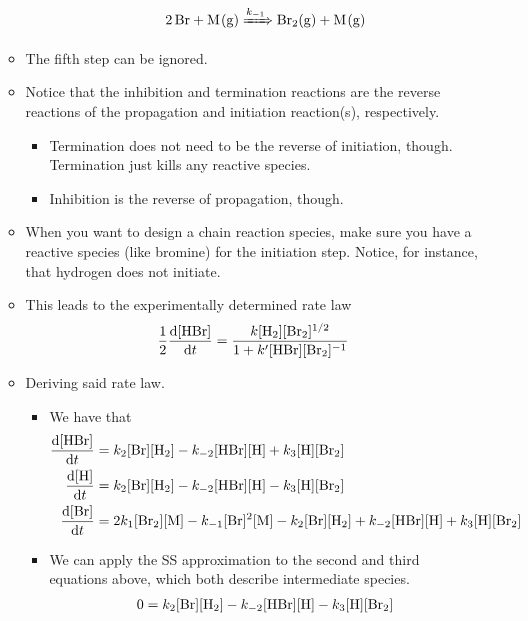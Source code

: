\documentclass[../notes.tex]{subfiles}
\begin{document}
\begin{itemize}
\begin{itemize}
\begin{itemize}
\begin{equation*}
                \ce{2Br + M(g)} \xRightarrow{k_{-1}} \ce{Br2(g) + M(g)}
            \end{equation*}
        \end{itemize}
        \item The fifth step can be ignored.
        \item Notice that the inhibition and termination reactions are the reverse reactions of the propagation and initiation reaction(s), respectively.
        \begin{itemize}
            \item Termination does not need to be the reverse of initiation, though. Termination just kills any reactive species.
            \item Inhibition is the reverse of propagation, though.
        \end{itemize}
        \item When you want to design a chain reaction species, make sure you have a reactive species (like bromine) for the initiation step. Notice, for instance, that hydrogen does not initiate.
        \item This leads to the experimentally determined rate law
        \begin{equation*}
            \frac{1}{2}\dv{[\ce{HBr}]}{t} = \frac{k[\ce{H2}][\ce{Br2}]^{1/2}}{1+k'[\ce{HBr}][\ce{Br2}]^{-1}}
        \end{equation*}
        \item Deriving said rate law.
        \begin{itemize}
            \item We have that
            \begin{align*}
                \dv{[\ce{HBr}]}{t} &= k_2[\ce{Br}][\ce{H2}]-k_{-2}[\ce{HBr}][\ce{H}]+k_3[\ce{H}][\ce{Br2}]\\
                \dv{[\ce{H}]}{t} &= k_2[\ce{Br}][\ce{H2}]-k_{-2}[\ce{HBr}][\ce{H}]-k_3[\ce{H}][\ce{Br2}]\\
                \dv{[\ce{Br}]}{t} &= 2k_1[\ce{Br2}][\ce{M}]-k_{-1}[\ce{Br}]^2[\ce{M}]-k_2[\ce{Br}][\ce{H2}]+k_{-2}[\ce{HBr}][\ce{H}]+k_3[\ce{H}][\ce{Br2}]
            \end{align*}
            \item We can apply the SS approximation to the second and third equations above, which both describe intermediate species.
            \begin{align*}
                0 &= k_2[\ce{Br}][\ce{H2}]-k_{-2}[\ce{HBr}][\ce{H}]-k_3[\ce{H}][\ce{Br2}]\\

\end{align*}
\end{itemize}
\end{itemize}
\end{itemize}
\end{document}
